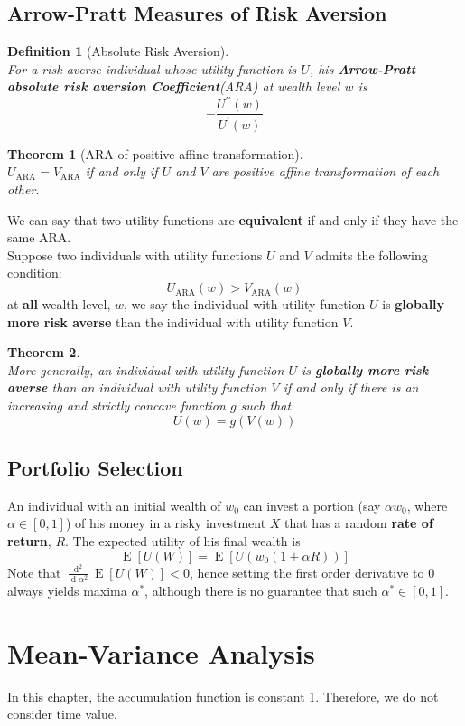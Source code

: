 \documentclass[12pt]{article}
\newtheorem{definition}{Definition}[section]
\newtheorem{theorem}{Theorem}[section]
\theoremstyle{definition}
\DeclareMathOperator{\diff}{d}
\DeclareMathOperator{\expec}{E}
\begin{document}
\subsection{Arrow-Pratt Measures of Risk Aversion}
\begin{definition}[Absolute Risk Aversion]
\hfill\\\normalfont For a \textit{risk averse} individual whose utility function is $U$, his \textbf{Arrow-Pratt absolute risk aversion Coefficient}(ARA) at wealth level $w$ is
\[
-\frac{U^{\prime\prime}(w)}{U^\prime(w)}
\]
\end{definition}
\begin{theorem}[ARA of positive affine transformation]
\hfill\\\normalfont $U_\text{ARA} = V_\text{ARA}$ if and only if $U$ and $V$ are positive affine transformation of each other.
\end{theorem}
We can say that two utility functions are \textbf{equivalent} if and only if they have the same ARA.\\
Suppose two individuals with utility functions $U$ and $V$ admits the following condition:
\[
U_\text{ARA}(w)>V_\text{ARA}(w)
\]
at \textbf{all} wealth level, $w$, we say the individual with utility function $U$ is \textbf{globally more risk averse} than the individual with utility function $V$.
\begin{theorem}
\hfill\\\normalfont More generally, an individual with utility function $U$ is \textbf{globally more risk averse} than an individual with utility function $V$ if and only if there is an increasing and strictly concave function $g$ such that
\[
U(w)=g(V(w))
\]
\end{theorem}
\subsection{Portfolio Selection}
An individual with an initial wealth of $w_0$ can invest a portion (say $\alpha w_0$, where $\alpha\in[0,1]$) of his money in a risky investment $X$ that has a random \textbf{rate of return}, $R$. The expected utility of his final wealth is
\[
\expec[U(W)]=\expec[U(w_0(1+\alpha R))]
\]
Note that $\frac{\diff^2}{\diff\alpha^2}\expec[U(W)]<0$, hence setting the first order derivative to 0 always yields maxima $\alpha^\ast$, although there is no guarantee that such $\alpha^\ast\in[0,1]$.
\clearpage
\section{Mean-Variance Analysis}
In this chapter, the accumulation function is constant 1. Therefore, we do not consider time value.
\end{document}
